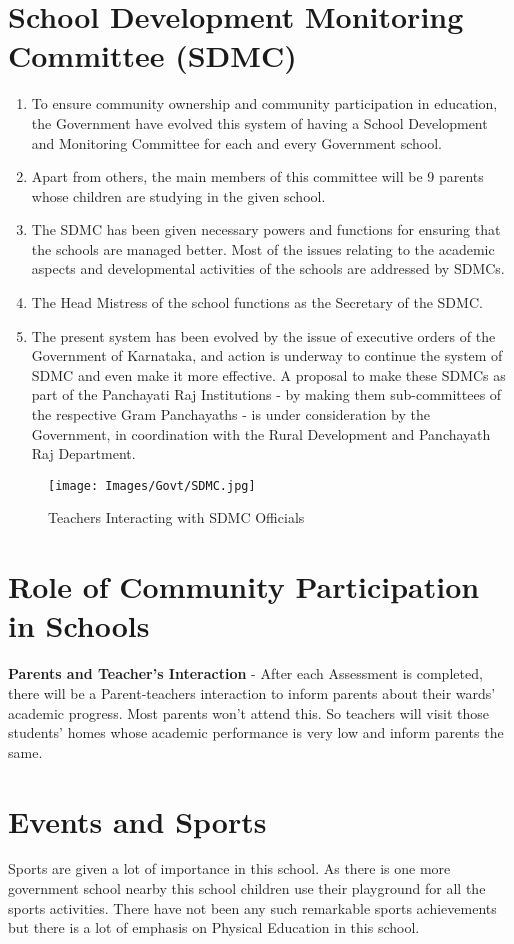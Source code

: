 \section{School Development Monitoring Committee (SDMC)}
\begin{enumerate}
\item To ensure community ownership and community participation in education, the Government have evolved this system of having a School Development and Monitoring 
Committee for each and every Government school. 
\item Apart from others, the main members of this committee will be 9 parents whose children are studying in the given school. 
\item The SDMC has been given necessary powers and functions for ensuring that the schools are managed better. Most of the issues relating to the academic aspects and developmental activities of the schools are addressed by SDMCs. 
\item The Head Mistress of the school functions as the Secretary of the SDMC.
\item The present system has been evolved by the issue of executive orders of the Government of Karnataka, and action is underway to continue the system of SDMC and even make it more effective. A proposal to make these SDMCs as part of the Panchayati Raj Institutions - by making them sub-committees of the respective Gram Panchayaths - is under consideration by the Government, in coordination with the Rural Development and Panchayath Raj Department.
\end{enumerate}

\begin{figure}[H]
    \centering
    \texttt{[image: Images/Govt/SDMC.jpg]}
    \caption*{Teachers Interacting with SDMC Officials}
\end{figure}

\section{Role of Community Participation in Schools}
\textbf{Parents and Teacher’s Interaction} -  After each Assessment is completed, there will be a Parent-teachers interaction to inform parents about their wards' academic progress. Most parents won’t attend this. So teachers will visit those students' homes whose academic performance is very low and inform parents the same.
\section{Events and Sports}
Sports are given a lot of importance in this school. As there is one more government school nearby this school children use their playground for all the sports activities. There have not been any such remarkable sports achievements but there is a lot of emphasis on Physical Education in this school. 

